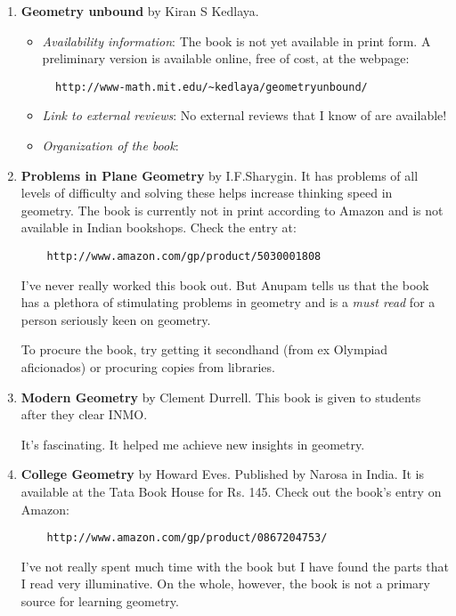\documentclass[a4paper]{amsart}
\begin{document}
\begin{enumerate}

\item {\bf Geometry unbound} by Kiran S Kedlaya.

  \begin{itemize}

  \item {\em Availability information}: The book is not yet available in print form. A preliminary version is available
    online, free of cost, at the webpage:

\begin{verbatim}
  http://www-math.mit.edu/~kedlaya/geometryunbound/
\end{verbatim}

  \item {\em Link to external reviews}: No external reviews that I know of are available!

  \item {\em Organization of the book}: 
  \end{itemize}

\item {\bf Problems in Plane Geometry} by I.F.Sharygin. It has problems of all levels of difficulty and solving these helps
  increase thinking speed in geometry. The book is currently not in print according to Amazon and is not available in Indian bookshops. 
  Check the entry at:
  
  \begin{verbatim}
    http://www.amazon.com/gp/product/5030001808
  \end{verbatim}

  I've never really worked this book out. But Anupam
  tells us that the book has a plethora of stimulating problems in geometry and is a {\em must read} for a person
  seriously keen on geometry.

  To procure the book, try getting it secondhand (from ex Olympiad aficionados) or procuring copies from libraries.

\item {\bf Modern Geometry} by Clement Durrell. This book is given to students after they clear INMO.

  It's fascinating. It helped me achieve new insights in geometry.

\item {\bf College Geometry} by Howard Eves. Published by Narosa in India. It is available at the Tata Book House for Rs. 145.
  Check out the book's entry on Amazon:
  \begin{verbatim}
    http://www.amazon.com/gp/product/0867204753/
  \end{verbatim}

  I've not really spent much time with the book but I have found the parts that I read very illuminative. On the whole, however,
  the book is not a primary source for learning geometry.
\end{enumerate}
\end{document}
